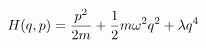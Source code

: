 \documentclass[preview]{standalone}
\begin{document}
\begin{align*}
\special{dvisvgm:raw <g id='unique000'>}H(q,p) = \frac{p^2}{2m} + \frac{1}{2}m \omega^2q^2 + \lambda q^4\special{dvisvgm:raw </g>}
\end{align*}
\end{document}
